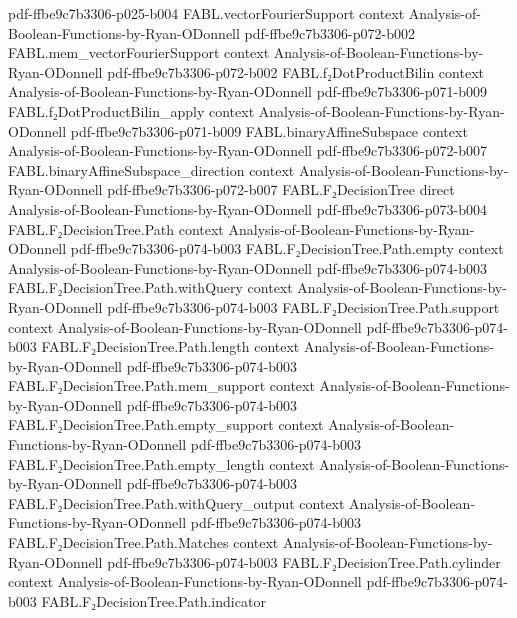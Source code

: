 \begin{theorem}
  {pdf-ffbe9c7b3306-p025-b004}
\proofstep
  {FABL.vectorFourierSupport}
  {context}
  {Analysis-of-Boolean-Functions-by-Ryan-ODonnell}
  {pdf-ffbe9c7b3306-p072-b002}
\proofstep
  {FABL.mem_vectorFourierSupport}
  {context}
  {Analysis-of-Boolean-Functions-by-Ryan-ODonnell}
  {pdf-ffbe9c7b3306-p072-b002}
\proofstep
  {FABL.f₂DotProductBilin}
  {context}
  {Analysis-of-Boolean-Functions-by-Ryan-ODonnell}
  {pdf-ffbe9c7b3306-p071-b009}
\proofstep
  {FABL.f₂DotProductBilin_apply}
  {context}
  {Analysis-of-Boolean-Functions-by-Ryan-ODonnell}
  {pdf-ffbe9c7b3306-p071-b009}
\proofstep
  {FABL.binaryAffineSubspace}
  {context}
  {Analysis-of-Boolean-Functions-by-Ryan-ODonnell}
  {pdf-ffbe9c7b3306-p072-b007}
\proofstep
  {FABL.binaryAffineSubspace_direction}
  {context}
  {Analysis-of-Boolean-Functions-by-Ryan-ODonnell}
  {pdf-ffbe9c7b3306-p072-b007}
\proofstep
  {FABL.F₂DecisionTree}
  {direct}
  {Analysis-of-Boolean-Functions-by-Ryan-ODonnell}
  {pdf-ffbe9c7b3306-p073-b004}
\proofstep
  {FABL.F₂DecisionTree.Path}
  {context}
  {Analysis-of-Boolean-Functions-by-Ryan-ODonnell}
  {pdf-ffbe9c7b3306-p074-b003}
\proofstep
  {FABL.F₂DecisionTree.Path.empty}
  {context}
  {Analysis-of-Boolean-Functions-by-Ryan-ODonnell}
  {pdf-ffbe9c7b3306-p074-b003}
\proofstep
  {FABL.F₂DecisionTree.Path.withQuery}
  {context}
  {Analysis-of-Boolean-Functions-by-Ryan-ODonnell}
  {pdf-ffbe9c7b3306-p074-b003}
\proofstep
  {FABL.F₂DecisionTree.Path.support}
  {context}
  {Analysis-of-Boolean-Functions-by-Ryan-ODonnell}
  {pdf-ffbe9c7b3306-p074-b003}
\proofstep
  {FABL.F₂DecisionTree.Path.length}
  {context}
  {Analysis-of-Boolean-Functions-by-Ryan-ODonnell}
  {pdf-ffbe9c7b3306-p074-b003}
\proofstep
  {FABL.F₂DecisionTree.Path.mem_support}
  {context}
  {Analysis-of-Boolean-Functions-by-Ryan-ODonnell}
  {pdf-ffbe9c7b3306-p074-b003}
\proofstep
  {FABL.F₂DecisionTree.Path.empty_support}
  {context}
  {Analysis-of-Boolean-Functions-by-Ryan-ODonnell}
  {pdf-ffbe9c7b3306-p074-b003}
\proofstep
  {FABL.F₂DecisionTree.Path.empty_length}
  {context}
  {Analysis-of-Boolean-Functions-by-Ryan-ODonnell}
  {pdf-ffbe9c7b3306-p074-b003}
\proofstep
  {FABL.F₂DecisionTree.Path.withQuery_output}
  {context}
  {Analysis-of-Boolean-Functions-by-Ryan-ODonnell}
  {pdf-ffbe9c7b3306-p074-b003}
\proofstep
  {FABL.F₂DecisionTree.Path.Matches}
  {context}
  {Analysis-of-Boolean-Functions-by-Ryan-ODonnell}
  {pdf-ffbe9c7b3306-p074-b003}
\proofstep
  {FABL.F₂DecisionTree.Path.cylinder}
  {context}
  {Analysis-of-Boolean-Functions-by-Ryan-ODonnell}
  {pdf-ffbe9c7b3306-p074-b003}
\proofstep
  {FABL.F₂DecisionTree.Path.indicator}

\end{theorem}
